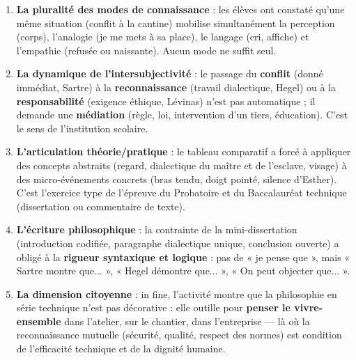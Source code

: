 \documentclass[11pt]{article}
\newcommand{\cle}[1]{{\popxbold\color{popdark}#1}}
\begin{document}
\begin{enumerate}
    \item \textbf{La pluralité des modes de connaissance} : les élèves ont constaté qu'une même situation (conflit à la cantine) mobilise simultanément la perception (corps), l'analogie (je me mets à sa place), le langage (cri, affiche) et l'empathie (refusée ou naissante). Aucun mode ne suffit seul.
    \item \textbf{La dynamique de l'intersubjectivité} : le passage du \textbf{conflit} (donné immédiat, Sartre) à la \textbf{reconnaissance} (travail dialectique, Hegel) ou à la \textbf{responsabilité} (exigence éthique, Lévinas) n'est pas automatique ; il demande une \textbf{médiation} (règle, loi, intervention d'un tiers, éducation). C'est le sens de l'institution scolaire.
    \item \textbf{L'articulation théorie/pratique} : le tableau comparatif a forcé à appliquer des concepts abstraits (regard, dialectique du maître et de l'esclave, visage) à des micro-événements concrets (bras tendu, doigt pointé, silence d'Esther). C'est l'exercice type de l'\cle{épreuve du Probatoire et du Baccalauréat technique} (dissertation ou commentaire de texte).
    \item \textbf{L'écriture philosophique} : la contrainte de la mini-dissertation (introduction codifiée, paragraphe dialectique unique, conclusion ouverte) a obligé à la \textbf{rigueur syntaxique et logique} : pas de « je pense que », mais « Sartre montre que... », « Hegel démontre que... », « On peut objecter que... ».
    \item \textbf{La dimension citoyenne} : in fine, l'activité montre que la philosophie en série technique n'est pas décorative : elle outille pour \textbf{penser le vivre-ensemble} dans l'atelier, sur le chantier, dans l'entreprise — là où la reconnaissance mutuelle (sécurité, qualité, respect des normes) est condition de l'efficacité technique et de la dignité humaine.
\end{enumerate}
\end{document}
